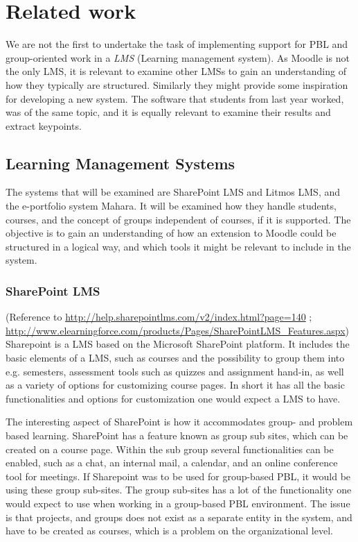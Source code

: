 \documentclass[a4paper,10pt]{article}
\begin{document}
    \newpage

\section{Related work}
We are not the first to undertake the task of implementing support for PBL and group-oriented work in a \textit{LMS} (Learning management system). As Moodle is not the only LMS, it is relevant to examine other LMSs to gain an understanding of how they typically are structured. Similarly they might provide some inspiration for developing a new system.
The software that students from last year worked, was of the same topic, and it is equally relevant to examine their results and extract keypoints.

\subsection{Learning Management Systems}
The systems that will be examined are SharePoint LMS and Litmos LMS, and the e-portfolio system Mahara.
It will be examined how they handle students, courses, and the concept of groups independent of courses, if it is supported.
The objective is to gain an understanding of how an extension to Moodle could be structured in a logical way, and which tools it might be relevant to include in the system.

\subsubsection{SharePoint LMS} (Reference to \url{http://help.sharepointlms.com/v2/index.html?page=140} ; \url{http://www.elearningforce.com/products/Pages/SharePointLMS_Features.aspx})
Sharepoint is a LMS based on the Microsoft SharePoint platform. It includes the basic elements of a LMS, such as courses and the possibility to group them into e.g. semesters, assessment tools such as quizzes and assignment hand-in, as well as a variety of options for customizing course pages.
In short it has all the basic functionalities and options for customization one would expect a LMS to have.

The interesting aspect of SharePoint is how it accommodates group- and problem based learning. SharePoint has a feature known as group sub sites, which can be created on a course page.
Within the sub group several functionalities can be enabled, such as a chat, an internal mail, a calendar, and an online conference tool for meetings.
If Sharepoint was to be used for group-based PBL, it would be using these group sub-sites.
The group sub-sites has a lot of the functionality one would expect to use when working in a group-based PBL environment.
The issue is that projects, and groups does not exist as a separate entity in the system, and have to be created as courses, which is a problem on the organizational level.
\end{document}
